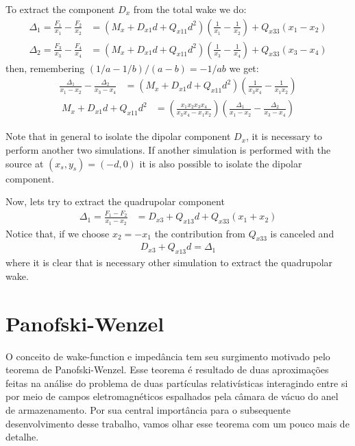 To extract the component $D_x$ from the total wake we do:
\begin{align}
\Delta_1 = \frac{F_1}{x_1} - \frac{F_2}{x_2} &= \left(M_x  +  D_{x1}d  +  Q_{x11}d^2\right)\left(\frac{1}{x_1}-\frac{1}{x_2}\right) + Q_{x33}(x_1-x_2) \\
\Delta_2 = \frac{F_3}{x_3} - \frac{F_4}{x_4} &= \left(M_x  +  D_{x1}d  +  Q_{x11}d^2\right)\left(\frac{1}{x_3}-\frac{1}{x_4}\right) + Q_{x33}(x_3-x_4)
\end{align}
then, remembering $(1/a-1/b)/(a-b) = -1/ab$ we get: 
\begin{align}
	\frac{\Delta_1}{x_1-x_2} - \frac{\Delta_2}{x_3-x_4} &= \left(M_x  +  D_{x1} d  +  Q_{x11} d^2\right)\left(\frac{1}{x_3x_4} - \frac{1}{x_1x_2}\right)
\end{align}
\begin{align}
	M_x  +  D_{x1} d +  Q_{x11} d^2 &= \left(\frac{x_1x_2x_3x_4}{x_3x_4 - x_1x_2}\right)\left(\frac{\Delta_1}{x_1-x_2} - \frac{\Delta_2}{x_3-x_4}\right)
\end{align}

Note that in general to isolate the dipolar component $D_x$, it is necessary to perform another two simulations. If another simulation is performed with the source at $(x_s,y_s) = (-d,0)$ it is also possible to isolate the dipolar component.

Now, lets try to extract the quadrupolar component
\begin{align}
\Delta_1 = \frac{F_1 - F_2}{x_1-x_2} &= D_{x3} + Q_{x13}d + Q_{x33}(x_1 + x_2)
\end{align}
Notice that, if we choose $x_2=-x_1$ the contribution from $Q_{x33}$ is canceled and
\begin{align}
	D_{x3} + Q_{x13}d = \Delta_1
\end{align}
where it is clear that is necessary other simulation to extract the quadrupolar wake.

\section{Panofski-Wenzel}

O conceito de wake-function e impedância tem seu surgimento motivado pelo teorema de Panofski-Wenzel. Esse teorema é resultado de duas aproximações feitas na análise do problema de duas partículas relativísticas interagindo entre si por meio de campos eletromagnéticos espalhados pela câmara de vácuo do anel de armazenamento. Por sua central importância para o subsequente desenvolvimento desse trabalho, vamos olhar esse teorema com um pouco mais de detalhe.

